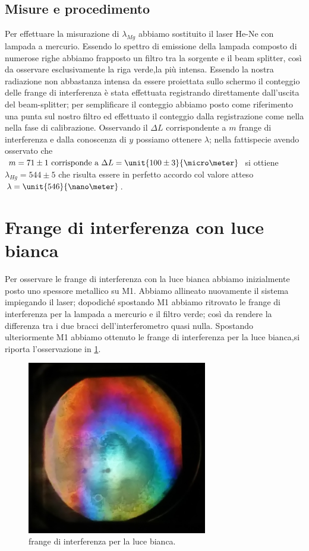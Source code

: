 \subsection{Misure e procedimento}
Per effettuare la misurazione di $\lambda_{Mg}$
abbiamo sostituito il laser He-Ne con 
lampada a mercurio.
Essendo lo spettro di emissione della lampada 
composto di numerose righe
abbiamo frapposto un filtro tra la sorgente e il beam splitter,
così da osservare esclusivamente la riga verde,la più intensa.
Essendo la nostra radiazione non abbastanza intensa da essere 
proiettata sullo schermo il conteggio delle frange di interferenza
è stata effettuata registrando direttamente dall'uscita del beam-splitter; 
per semplificare il conteggio abbiamo 
posto come riferimento una punta sul nostro filtro ed effettuato il conteggio 
dalla registrazione come nella nella fase di calibrazione.
Osservando il $\Delta L$ corrispondente a $m$ frange di
interferenza e dalla conoscenza di $y$ 
possiamo ottenere $\lambda$;
nella fattispecie avendo osservato che
\\
 $m=71 \pm 1\text{ corrisponde a } \Delta L =\unit{100\pm 3}{\micro\meter}$
si ottiene $\lambda_{Hg}=544\pm 5$ che 
risulta essere in perfetto accordo col valore atteso 	
$\lambda = \unit{546}{\nano\meter}$.
\section{Frange di interferenza con luce bianca}
Per osservare le frange di interferenza con la luce bianca
abbiamo inizialmente posto uno spessore metallico su M1.
Abbiamo allineato nuovamente il sistema impiegando il laser;
dopodiché spostando M1 abbiamo ritrovato le frange di interferenza
per la lampada a mercurio e il filtro verde; così da rendere 
la differenza tra i due bracci dell'interferometro quasi nulla.
Spostando ulteriormente M1 abbiamo ottenuto le frange di interferenza per
la luce bianca,si riporta l'osservazione in \figurename{ \ref{fig:frangeb}}.


\begin{figure} [h]
	\centering
	\includegraphics[width=0.7\textwidth]{./pictures/frange.jpg}
	\caption{frange di interferenza per la luce bianca.}
	\label{fig:frangeb}
\end{figure}


